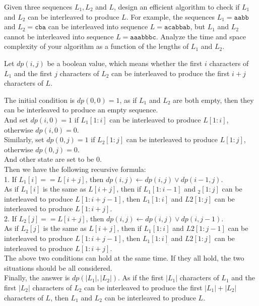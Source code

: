 \problem{}
Given three sequences $L_1, L_2$ and $L$, design an efficient algorithm to check if $L_1$ and $L_2$ can be interleaved to produce $L$.  For example, the sequences $L_1 = \texttt{aabb}$ and $L_2 = \texttt{cba}$ can be interleaved into sequence $L = \texttt{acabbab}$, but $L_1$ and $L_2$ cannot be interleaved into sequence $L = \texttt{aaabbbc}$.  Analyze the time and space complexity of your algorithm as a function of the lengths of $L_1$ and $L_2$.

\solution{}

Let $dp(i,j)$ be a boolean value, which means whether the first $i$ characters of $L_1$ and the first $j$ characters of $L_2$ can be interleaved to produce the first $i+j$ characters of $L$.

The initial condition is $dp(0,0)=1$, as if $L_1$ and $L_2$ are both empty, then they can be interleaved to produce an empty sequence. \\
And set $dp(i,0)=1$ if $L_1[1:i]$ can be interleaved to produce $L[1:i]$, otherwise $dp(i,0)=0$.\\
Similarly, set $dp(0,j)=1$ if $L_2[1:j]$ can be interleaved to produce $L[1:j]$, otherwise $dp(0,j)=0$.\\
And other state are set to be $0$.\\

Then we have the following recursive formula:\\

1. If $L_1[i] == L[i+j]$, then $dp(i,j) \gets dp(i,j) \lor dp(i-1,j)$.\\
As if $L_1[i]$ is the same as $L[i+j]$, then if $L_1[1:i-1]$ and $_2[1:j]$ can be interleaved to produce $L[1:i+j-1]$, then $L_1[1:i]$ and $L2[1:j]$ can be interleaved to produce $L[1:i+j]$.\\

2. If $L_2[j] == L[i+j]$, then $dp(i,j) \gets dp(i,j) \lor dp(i,j-1)$.\\
As if $L_2[j]$ is the same as $L[i+j]$, then if $L_1[1:i]$ and $L2[1:j-1]$ can be interleaved to produce $L[1:i+j-1]$, then $L_1[1:i]$ and $L2[1:j]$ can be interleaved to produce $L[1:i+j]$.\\
The above two conditions can hold at the same time. If they all hold, the two situations should be all considered.\\

Finally, the answer is $dp(|L_1|,|L_2|)$. As if the first $|L_1|$ characters of $L_1$ and the first $|L_2|$ characters of $L_2$ can be interleaved to produce the first $|L_1|+|L_2|$ characters of $L$, then $L_1$ and $L_2$ can be interleaved to produce $L$.\\

